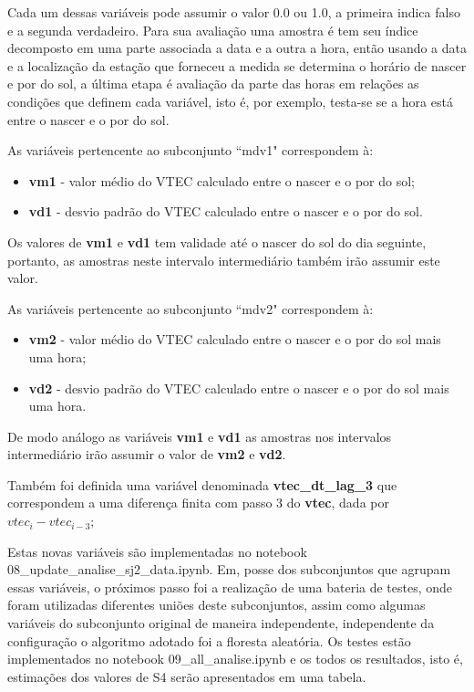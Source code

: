 Cada um dessas variáveis pode assumir o valor 0.0 ou 1.0, a primeira indica falso e a segunda verdadeiro. Para sua avaliação uma amostra é tem seu índice decomposto em uma parte associada a data e a outra a hora, então usando a data e a localização da estação que forneceu a medida se determina o horário de nascer e por do sol, a última etapa é avaliação da parte das horas em relações as condições que definem cada variável, isto é, por exemplo, testa-se se a hora está entre o nascer e o por do sol.

As variáveis pertencente ao subconjunto ``mdv1" correspondem à:

\begin{itemize}
\item {\bf vm1} - valor médio do VTEC calculado entre o nascer e o por do sol;
\item {\bf vd1} - desvio padrão do VTEC calculado entre o nascer e o por do sol.
\end{itemize}

Os valores de {\bf vm1} e {\bf vd1} tem validade até o nascer do sol do dia seguinte, portanto, as amostras neste intervalo intermediário também irão assumir este valor.

As variáveis pertencente ao subconjunto ``mdv2" correspondem à:

\begin{itemize}
\item {\bf vm2} - valor médio do VTEC calculado entre o nascer e o por do sol mais uma hora;
\item {\bf vd2} - desvio padrão do VTEC calculado entre o nascer e o por do sol mais uma hora.
\end{itemize}

De modo análogo as variáveis {\bf vm1} e {\bf vd1} as amostras nos intervalos intermediário irão assumir o valor de {\bf vm2} e {\bf vd2}.

Também foi definida uma variável denominada {\bf vtec\_dt\_lag\_3} que correspondem a uma diferença finita com passo 3 do {\bf vtec}, dada por $vtec_i-vtec_{i-3}$;

Estas novas variáveis são implementadas no notebook 08\_update\_analise\_sj2\_data.ipynb. Em, posse dos subconjuntos que agrupam essas variáveis, o próximos passo foi a realização de uma bateria de testes, onde foram utilizadas diferentes uniões deste subconjuntos, assim como algumas variáveis do subconjunto original de maneira independente, independente da configuração o algoritmo adotado foi a floresta aleatória. Os testes estão implementados no notebook 09\_all\_analise.ipynb e os todos os resultados, isto é, estimações dos valores de S4 serão apresentados em uma tabela.
